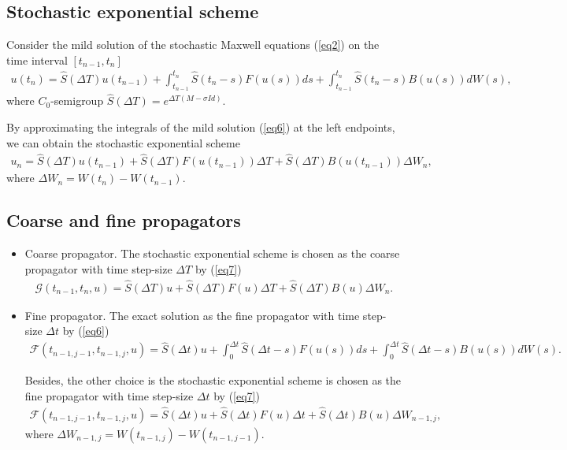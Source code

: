 \documentclass[preprint,12pt]{elsarticle}
\begin{document}
	\subsection{Stochastic exponential scheme} 
	Consider the mild solution of the stochastic Maxwell equations (\ref{eq2}) on the time interval $[t_{n-1},t_{n}]$ 
	\begin{align}\label{eq6}
		u(t_{n})=\widehat S(\Delta T)u(t_{n-1})+\int_{t_{n-1}}^{t_{n}}\widehat S(t_{n}-s)F(u(s))ds+\int_{t_{n-1}}^{t_{n}}\widehat S(t_{n}-s)B(u(s))dW(s),
	\end{align} 
	where $C_{0}$-semigroup $\widehat S(\Delta T)=e^{\Delta T(M-\sigma Id) }$.
	
	By approximating the integrals of the mild solution (\ref{eq6}) at the left endpoints, we can obtain the stochastic exponential scheme
	\begin{align}\label{eq7}
		u_{n}=\widehat S(\Delta T)u(t_{n-1})+\widehat S(\Delta T)F(u(t_{n-1}))\Delta T+\widehat S(\Delta T)B(u(t_{n-1}))\Delta W_{n},
	\end{align}
	where $\Delta W_{n}=W(t_{n})-W(t_{n-1})$.
	\subsection{Coarse and fine propagators}
	\begin{itemize}
		\item Coarse propagator.
		The stochastic exponential scheme is chosen as
		the coarse propagator  with
		time step-size $\Delta T$ by (\ref{eq7})
		\begin{align}\label{eq8}
			\mathcal{G}(t_{n-1},t_{n},u)=\widehat S(\Delta T)u+\widehat S(\Delta T)F(u)\Delta T+\widehat S(\Delta T)B(u)\Delta W_{n}.
		\end{align}
		\item Fine propagator.
		The exact solution as the fine propagator with time step-size $\Delta t$ by (\ref{eq6}) 
		\begin{align}\label{eq9}
			\!\!\!\!\!\!\!\!\!\mathcal{F}(t_{n-1,j-1},t_{n-1,j},u)=\widehat S(\Delta t)u\!\!+\!\!\int_{0}^{\Delta t}\!\!\widehat S(\Delta t-s)F(u(s))ds
			\!\!+\!\!\int_{0}^{\Delta t}\!\!\!\widehat S(\Delta t-s)B(u(s))dW(s).
		\end{align}
		
		Besides, the other choice is the stochastic exponential scheme is chosen as the fine propagator with time step-size $\Delta t$ by (\ref{eq7})
		\begin{align}\label{eq10}
			\mathcal{F}(t_{n-1,j-1},t_{n-1,j},u)=\widehat S(\Delta t)u+\widehat S(\Delta t)F(u)\Delta t+\widehat S(\Delta t)B(u)\Delta W_{n-1,j},
		\end{align}
		where  $\Delta W_{n-1,j}=W(t_{n-1,j})-W(t_{n-1,j-1})$.
	\end{itemize}
\end{document}

